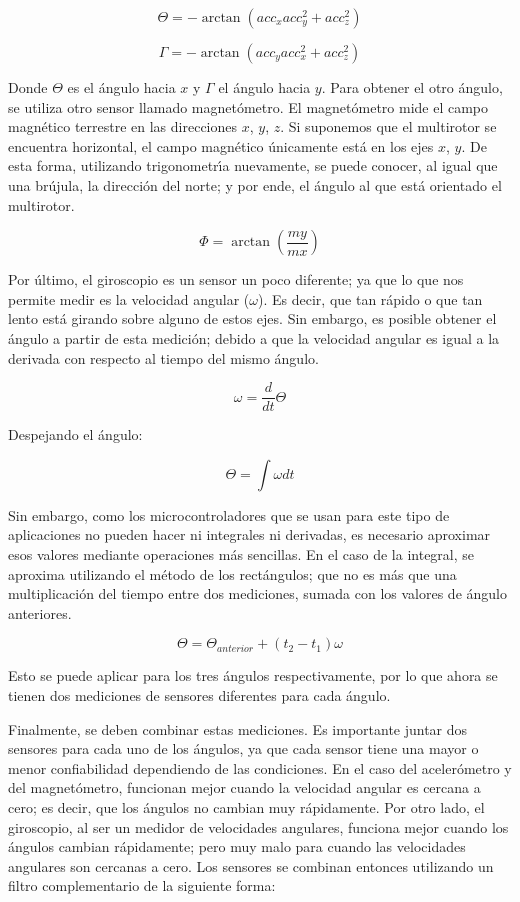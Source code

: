\documentclass[journal]{IEEEtran}
\begin{document}
\[\Theta = -\arctan(acc_x acc_y^{2}+acc_z^{2})\]

\[\Gamma = -\arctan(acc_y acc_x^{2}+acc_z^{2})\]

Donde $\Theta$ es el \'angulo hacia $x$ y $\Gamma$ el \'angulo hacia $y$. Para obtener el otro \'angulo, se utiliza otro sensor llamado magnet\'ometro. El magnet\'ometro mide el campo magn\'etico terrestre en las direcciones $x$, $y$, $z$. Si suponemos que el multirotor se encuentra horizontal, el campo magn\'etico \'unicamente est\'a en los ejes $x$, $y$. De esta forma, utilizando trigonometr{\'\i}a nuevamente, se puede conocer, al igual que una br\'ujula, la direcci\'on del norte; y por ende, el \'angulo al que est\'a orientado el multirotor. 

\[\Phi = \arctan(\frac{my}{mx})\]


Por \'ultimo, el giroscopio es un sensor un poco diferente; ya que lo que nos permite medir es la velocidad angular ($\omega$). Es decir, que tan r\'apido o que tan lento est\'a girando sobre alguno de estos ejes. Sin embargo, es posible obtener el \'angulo a partir de esta medici\'on; debido a que la velocidad angular es igual a la derivada con respecto al tiempo del mismo \'angulo.

\[\omega = \frac{d}{dt} \Theta\]


Despejando el \'angulo:

\[\Theta = \int \omega dt\]

Sin embargo, como los microcontroladores que se usan para este tipo de aplicaciones no pueden hacer ni integrales ni derivadas, es necesario aproximar esos valores mediante operaciones m\'as sencillas. En el caso de la integral, se aproxima utilizando el m\'etodo de los rect\'angulos; que no es m\'as que una multiplicaci\'on del tiempo entre dos mediciones, sumada con los valores de \'angulo anteriores.

\[\Theta = \Theta_{anterior} + (t_2-t_1)\omega\]


Esto se puede aplicar para los tres \'angulos respectivamente, por lo que ahora se tienen dos mediciones de sensores diferentes para cada \'angulo. 

Finalmente, se deben combinar estas mediciones. Es importante juntar dos sensores para cada uno de los \'angulos, ya que cada sensor tiene una mayor o menor confiabilidad dependiendo de las condiciones. En el caso del aceler\'ometro y del magnet\'ometro, funcionan mejor cuando la velocidad angular es cercana a cero; es decir, que los \'angulos no cambian muy r\'apidamente. Por otro lado, el giroscopio, al ser un medidor de velocidades angulares, funciona mejor cuando los \'angulos cambian r\'apidamente; pero muy malo para cuando las velocidades angulares son cercanas a cero. 
Los sensores se combinan entonces utilizando un filtro complementario de la siguiente forma:
\end{document}
